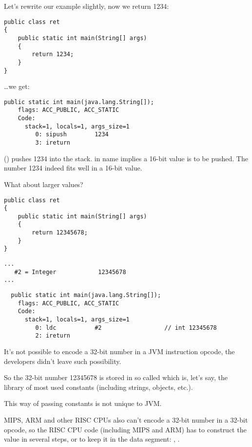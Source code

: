 Let's rewrite our example slightly, now we return 1234:

\begin{lstlisting}
public class ret
{
	public static int main(String[] args)
	{
		return 1234;
	}
}
\end{lstlisting}

\dots we get:

\begin{lstlisting}[caption=JDK 1.7 (excerpt)]
  public static int main(java.lang.String[]);
    flags: ACC_PUBLIC, ACC_STATIC
    Code:
      stack=1, locals=1, args_size=1
         0: sipush        1234
         3: ireturn       
\end{lstlisting}

 () pushes 1234 into the stack.
 in name implies a 16-bit value is to be pushed. 
The number 1234 indeed fits well in a 16-bit value.

What about larger values?

\begin{lstlisting}
public class ret
{
	public static int main(String[] args) 
	{
		return 12345678;
	}
}
\end{lstlisting}

\begin{lstlisting}[caption=Constant pool]
...
   #2 = Integer            12345678
...
\end{lstlisting}

\begin{lstlisting}
  public static int main(java.lang.String[]);
    flags: ACC_PUBLIC, ACC_STATIC
    Code:
      stack=1, locals=1, args_size=1
         0: ldc           #2                  // int 12345678
         2: ireturn       
\end{lstlisting}

It's not possible to encode a 32-bit number in a JVM instruction opcode, 
the developers didn't leave such possibility.

So the 32-bit number 12345678 is stored in so called  which is, let's say,
the library of most used constants (including strings, objects, etc.).

This way of passing constants is not unique to JVM.

MIPS, ARM and other RISC CPUs also can't encode a 32-bit number
in a 32-bit opcode, so the RISC CPU code (including MIPS and ARM) has to construct the value 
in several steps, or to keep it in the data segment:
, .

